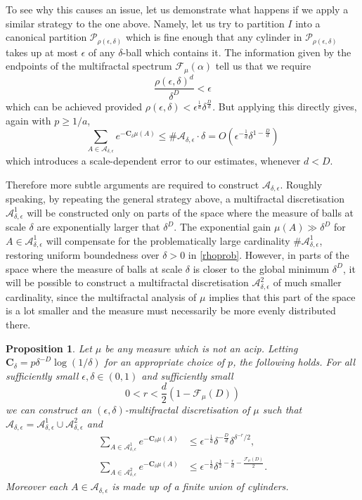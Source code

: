 \documentclass[11pt, reqno]{amsart}
\numberwithin{equation}{section}
\theoremstyle{plain}%
\newtheorem{prop}[thm]{Proposition}
\theoremstyle{definition}
\def\F{\ensuremath{\mathcal F}}
\def\A{\ensuremath{\mathscr A}}
\renewcommand{\A}{\mathcal{A}}
\renewcommand{\F}{\mathcal{F}}
\theoremstyle{nonumberplain}
\begin{document}
To see why this causes an issue, let us demonstrate what happens if we apply a similar strategy to the one above. Namely, let us try to partition $I$ into a canonical partition $\mathscr{P}_{\rho(\epsilon,\delta)}$ which is fine enough that any cylinder in $\mathscr{P}_{\rho(\epsilon,\delta)}$ takes up at most $\epsilon$ of any $\delta$-ball which contains it. The information given by the endpoints of the multifractal spectrum $\F_\mu(\alpha)$ tell us that we require
$$\frac{\rho(\epsilon,\delta)^{d}}{\delta^{D}}<\epsilon$$
which can be achieved provided $\rho(\epsilon,\delta)<\epsilon^{\frac{1}{d}}\delta^{\frac{D}{d}}$. But applying this directly gives, again with $p\ge 1/a$, 
\begin{equation}\sum_{A \in \A_{\delta,\epsilon}} e^{-\mathbf{C}_\delta \mu(A)} \leq \#\A_{\delta,\epsilon} \cdot \delta=O(\epsilon^{-\frac{1}{d}}\delta^{1-\frac{D}{d}})\label{rhoprob}\end{equation}
which introduces a scale-dependent error to our estimates, whenever $d<D$.

Therefore more subtle arguments are required to construct $\A_{\delta,\epsilon}$. Roughly speaking, by repeating the general strategy above, a multifractal discretisation $\A_{\delta,\epsilon}^1$ will be constructed only on parts of the space where the measure of balls at scale $\delta$ are exponentially larger that $\delta^{D}$. The exponential gain $\mu(A) \gg\delta^{D}$ for $A \in\A_{\delta,\epsilon}^1$ will compensate for the problematically large cardinality $\#\A_{\delta,\epsilon}^1$, restoring uniform boundedness over $\delta>0$ in \eqref{rhoprob}. However, in parts of the space where the measure of balls at scale $\delta$ is closer to the global minimum $\delta^{D}$, it will be possible to construct a multifractal discretisation $\A_{\delta,\epsilon}^2$ of much smaller cardinality, since the multifractal analysis of $\mu$ implies that this part of the space is a lot smaller and the measure must necessarily be more evenly distributed there.


\begin{prop}\label{mainmf} Let $\mu$ be any measure which is not an acip.  Letting  $\mathbf{C}_\delta= p\delta^{-D}\log(1/\delta)$ for an appropriate choice of $p$, the following holds. 
For all sufficiently small $\epsilon, \delta \in (0,1)$ and sufficiently small
$$0<r<\frac{d}{2}(1-\F_\mu(D))$$
we can construct an $(\epsilon,\delta)$-multifractal discretisation of $\mu$ such that  $\A_{\delta,\epsilon}=\A_{\delta,\epsilon}^1\cup \A_{\delta,\epsilon}^2$ and 
\begin{align*}
\sum_{A \in \A^1_{\delta,\epsilon}} e^{-\mathbf{C}_\delta \mu(A)}& \leq \epsilon^{-\frac{1}{d}}\delta^{-\frac{D}{d}}\delta^{\delta^{-r}/2}, \\
\sum_{A \in \A^2_{\delta,\epsilon}} e^{-\mathbf{C}_\delta \mu(A)} &\leq\epsilon^{-\frac{1}{d}} \delta^{\frac{1}{2}-\frac{r}{d}-\frac{\F_\mu(D)}{2}}.
\end{align*}
Moreover each $A \in\A_{\delta,\epsilon}$ is made up of a finite union of cylinders.
\end{prop}
\end{document}
